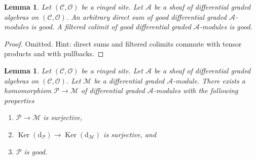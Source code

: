 \documentclass{stacks-project}
\theoremstyle{plain}
\newtheorem{lemma}[subsection]{Lemma}
\theoremstyle{definition}
\theoremstyle{remark}
\numberwithin{equation}{subsection}
\def\Ker{\mathop{\mathrm{Ker}}}
\begin{document}
\begin{lemma}
\label{lemma-good-direct-sum}
Let $(\mathcal{C}, \mathcal{O})$ be a ringed site.
Let $\mathcal{A}$ be a sheaf of differential graded algebras
on $(\mathcal{C}, \mathcal{O})$. An arbitrary
direct sum of good differential graded $\mathcal{A}$-modules
is good. A filtered colimit of good differential graded
$\mathcal{A}$-modules is good. 
\end{lemma}

\begin{proof}
Omitted. Hint: direct sums and filtered colimits
commute with tensor products and with pullbacks.
\end{proof}

\begin{lemma}
\label{lemma-good-quotient}
Let $(\mathcal{C}, \mathcal{O})$ be a ringed site.
Let $\mathcal{A}$ be a sheaf of differential graded algebras
on $(\mathcal{C}, \mathcal{O})$. Let $\mathcal{M}$
be a differential graded $\mathcal{A}$-module. There exists a homomorphism
$\mathcal{P} \to \mathcal{M}$ of differential graded $\mathcal{A}$-modules
with the following properties
\begin{enumerate}
\item $\mathcal{P} \to \mathcal{M}$ is surjective,
\item $\Ker(\text{d}_\mathcal{P}) \to \Ker(\text{d}_\mathcal{M})$
is surjective, and
\item $\mathcal{P}$ is good.
\end{enumerate}
\end{lemma}
\end{document}
